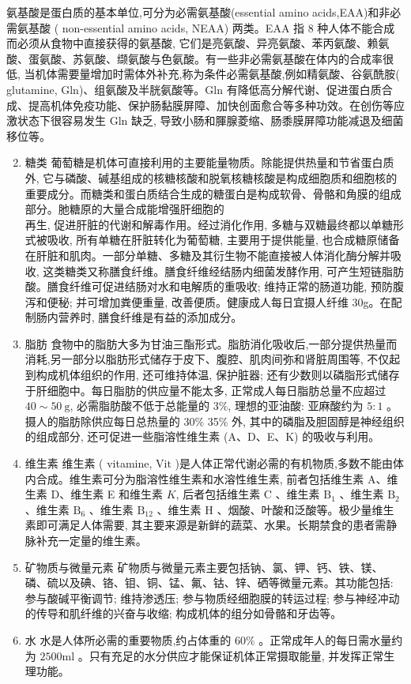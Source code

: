 \documentclass[10pt]{article}
\begin{document}
氨基酸是蛋白质的基本单位,可分为必需氨基酸(essential amino acids,EAA)和非必需氨基酸 ( non-essential amino acids, NEAA) 两类。EAA 指 8 种人体不能合成而必须从食物中直接获得的氨基酸, 它们是亮氨酸、异亮氨酸、苯丙氨酸、赖氨酸、蛋氨酸、苏氨酸、缬氨酸与色氨酸。有一些非必需氨基酸在体内的合成率很低, 当机体需要量增加时需体外补充,称为条件必需氨基酸,例如精氨酸、谷氨酰胺( glutamine, Gln)、组氨酸及半胱氨酸等。Gln 有降低高分解代谢、促进蛋白质合成、提高机体免疫功能、保护肠黏膜屏障、加快创面愈合等多种功效。在创伤等应激状态下很容易发生 Gln 缺乏, 导致小肠和腪腺菱缩、肠黍膜屏障功能减退及细菌移位等。

\begin{enumerate}
  \setcounter{enumi}{1}
  \item 糖类 葡萄糖是机体可直接利用的主要能量物质。除能提供热量和节省蛋白质外, 它与磷酸、碱基组成的核糖核酸和脱氧核糖核酸是构成细胞质和细胞核的重要成分。而糖类和蛋白质结合生成的糖蛋白是构成软骨、骨骼和角膜的组成部分。肔糖原的大量合成能增强肝细胞的\\
再生, 促进肝脏的代谢和解毒作用。经过消化作用, 多糖与双糖最终都以单糖形式被吸收, 所有单糖在肝脏转化为葡萄糖, 主要用于提供能量, 也合成糖原储备在肝脏和肌肉。一部分单糖、多糖及其衍生物不能直接被人体消化酶分解并吸收, 这类糖类又称膳食纤维。膳食纤维经结肠内细菌发酵作用, 可产生短链脂肪酸。膳食纤维可促进结肠对水和电解质的重吸收; 维持正常的肠道功能, 预防腹泻和便秘; 并可增加粪便重量, 改善便质。健康成人每日宜摄人纤维 30g。在配制肠内营养时, 膳食纤维是有益的添加成分。

  \item 脂肪 食物中的脂肪大多为甘油三酯形式。脂肪消化吸收后,一部分提供热量而消耗,另一部分以脂肪形式储存于皮下、腹腔、肌肉间弥和肾脏周围等, 不仅起到构成机体组织的作用, 还可维持体温, 保护脏器; 还有少数则以磷脂形式储存于肝细胞中。每日脂肪的供应量不能太多, 正常成人每日脂肪总量不应超过 $40 \sim 50 \mathrm{~g}$, 必需脂肪酸不低于总能量的 $3 \%$, 理想的亚油酸: 亚麻酸约为 $5: 1$ 。摄人的脂肪除供应每日总热量的 30\% 35\% 外, 其中的磷脂及胆固醇是神经组织的组成部分, 还可促进一些脂溶性维生素 (A、D、E、K) 的吸收与利用。

  \item 维生素 维生素 ( vitamine, $\mathrm{Vit}$ )是人体正常代谢必需的有机物质,多数不能由体内合成。维生素可分为脂溶性维生素和水溶性维生素, 前者包括维生素 A、维生素 D、维生素 E 和维生素 $K$, 后者包括维生素 $\mathrm{C}$ 、维生素 $\mathrm{B}_{1}$ 、维生素 $\mathrm{B}_{2}$ 、维生素 $\mathrm{B}_{6}$ 、维生素 $\mathrm{B}_{12}$ 、维生素 $\mathrm{H}$ 、烟酸、叶酸和泛酸等。极少量维生素即可满足人体需要, 其主要来源是新鲜的蔬菜、水果。长期禁食的患者需静脉补充一定量的维生素。

  \item 矿物质与微量元素 矿物质与微量元素主要包括钠、氯、钾、钙、铁、镁、磷、硫以及碘、铬、钼、铜、锰、氟、钴、锌、硒等微量元素。其功能包括: 参与酸碱平衡调节; 维持渗透压; 参与物质经细胞膜的转运过程; 参与神经冲动的传导和肌纤维的兴奋与收缩; 构成机体的组分如骨骼和牙齿等。

  \item 水 水是人体所必需的重要物质,约占体重的 $60 \%$ 。正常成年人的每日需水量约为 $2500 \mathrm{ml}$ 。只有充足的水分供应才能保证机体正常摄取能量, 并发挥正常生理功能。

\end{enumerate}
\end{document}
